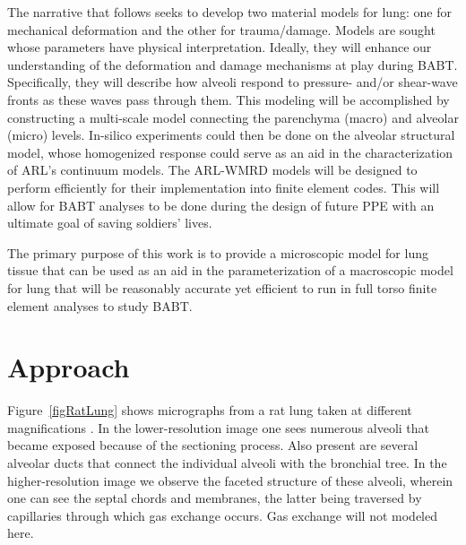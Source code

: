 The narrative that follows seeks to develop two material models for lung: one for mechanical deformation and the other for trauma\slash damage.  Models are sought whose parameters have physical interpretation.  Ideally, they will enhance our understanding of the deformation and damage mechanisms at play during BABT.  Specifically, they will describe how alveoli respond to pressure- and\slash or shear-wave fronts as these waves pass through them.  This modeling will be accomplished by constructing a multi-scale model connecting the parenchyma (macro) and alveolar (micro) levels.  In-silico experiments could then be done on the alveolar structural model, whose homogenized response could serve as an aid in the characterization of ARL's continuum models.  The ARL-WMRD models will be designed to perform efficiently for their implementation into finite element codes.  This will allow for BABT analyses to be done during the design of future PPE with an ultimate goal of saving soldiers' lives.

The primary purpose of this work is to provide a micro\-scopic model for lung tissue that can be used as an aid in the parameterization of a macro\-scopic model for lung that will be reasonably accurate yet efficient to run in full torso finite element analyses to study BABT.

\section{Approach}

Figure~\ref{figRatLung} shows micrographs from a rat lung taken at different magnifications \cite{Freedetal12}. In the lower-resolution image one sees numerous alveoli that became exposed because of the sectioning process.  Also present are several alveolar ducts that connect the individual alveoli with the bronchial tree.  In the higher-resolution image we observe the faceted structure of these alveoli, wherein one can see the septal chords and membranes, the latter being traversed by capillaries through which gas exchange occurs.  Gas exchange will not modeled here.

